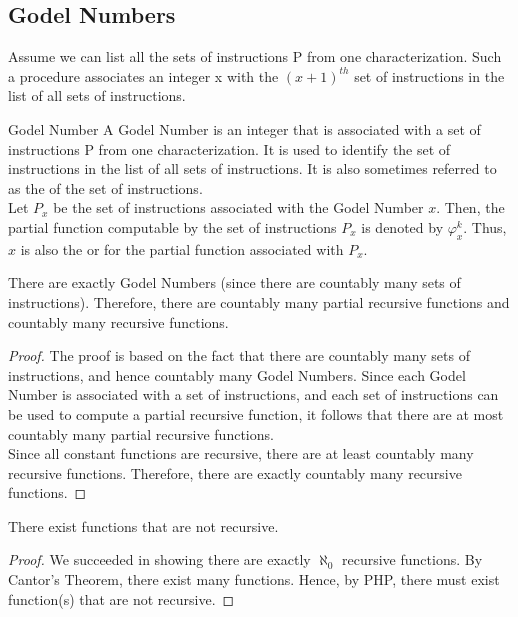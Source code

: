 \documentclass[openany]{book}
\begin{document}
\subsection{Godel Numbers}
Assume we can list all the sets of instructions P from one characterization. Such a procedure associates an integer x with the $(x+1)^{th}$ set of instructions in the list of all sets of instructions. 
\begin{mydefinition}{Godel Number}
    A Godel Number is an integer that is associated with a set of instructions P from one characterization. It is used to identify the set of instructions in the list of all sets of instructions. It is also sometimes referred to as the  of the set of instructions. \\ 
    Let $P_x$ be the set of instructions associated with the Godel Number $x$. Then, the partial function computable by the set of instructions $P_x$ is denoted by $\varphi_x^k$. Thus, $x$ is also the  or  for the partial function associated with $P_x$.  
\end{mydefinition}
\begin{mytheorem}
    There are exactly  Godel Numbers (since there are countably many sets of instructions). Therefore, there are countably many partial recursive functions and countably many recursive functions. 
\end{mytheorem}
\begin{proof}
    The proof is based on the fact that there are countably many sets of instructions, and hence countably many Godel Numbers. Since each Godel Number is associated with a set of instructions, and each set of instructions can be used to compute a partial recursive function, it follows that there are at most countably many partial recursive functions. \\
    Since all constant functions are recursive, there are at least countably many recursive functions. Therefore, there are exactly countably many recursive functions.
\end{proof}
\begin{mytheorem}
    There exist functions that are not recursive.
\end{mytheorem}
\begin{proof}
    We succeeded in showing there are exactly $\aleph_0$ recursive functions. By Cantor's Theorem, there exist  many functions. Hence, by PHP, there must exist function(s) that are not recursive. 
\end{proof}
\end{document}
